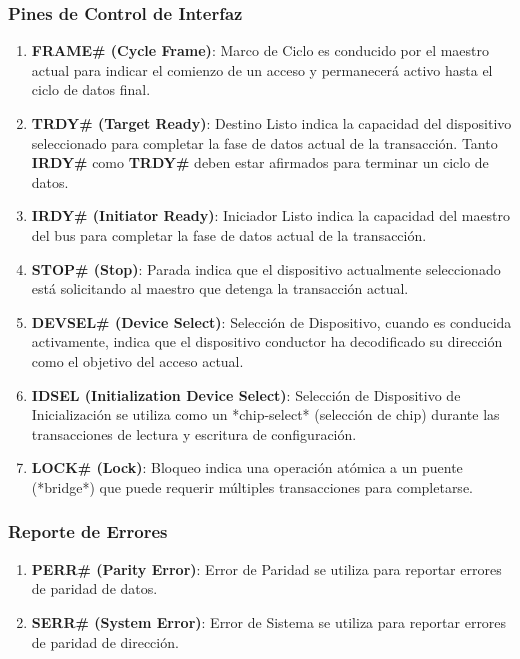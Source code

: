 \documentclass[12pt]{article}
\begin{document}
	\subsubsection*{Pines de Control de Interfaz}
	\begin{enumerate}
		\item \textbf{FRAME\# (Cycle Frame)}: Marco de Ciclo es conducido por el maestro actual para indicar el comienzo de un acceso y permanecerá activo hasta el ciclo de datos final.
		
		\item \textbf{TRDY\# (Target Ready)}: Destino Listo indica la capacidad del dispositivo seleccionado para completar la fase de datos actual de la transacción. Tanto \textbf{IRDY\#} como \textbf{TRDY\#} deben estar afirmados para terminar un ciclo de datos.
		
		\item \textbf{IRDY\# (Initiator Ready)}: Iniciador Listo indica la capacidad del maestro del bus para completar la fase de datos actual de la transacción.
		
		\item \textbf{STOP\# (Stop)}: Parada indica que el dispositivo actualmente seleccionado está solicitando al maestro que detenga la transacción actual.
		
		\item \textbf{DEVSEL\# (Device Select)}: Selección de Dispositivo, cuando es conducida activamente, indica que el dispositivo conductor ha decodificado su dirección como el objetivo del acceso actual.
		
		\item \textbf{IDSEL (Initialization Device Select)}: Selección de Dispositivo de Inicialización se utiliza como un *chip-select* (selección de chip) durante las transacciones de lectura y escritura de configuración.
		
		\item \textbf{LOCK\# (Lock)}: Bloqueo indica una operación atómica a un puente (*bridge*) que puede requerir múltiples transacciones para completarse.
	\end{enumerate}
	
	\subsubsection*{Reporte de Errores}
	\begin{enumerate}
		\item \textbf{PERR\# (Parity Error)}: Error de Paridad se utiliza para reportar errores de paridad de datos.
		
		\item \textbf{SERR\# (System Error)}: Error de Sistema se utiliza para reportar errores de paridad de dirección.
	\end{enumerate}
	
\end{document}
